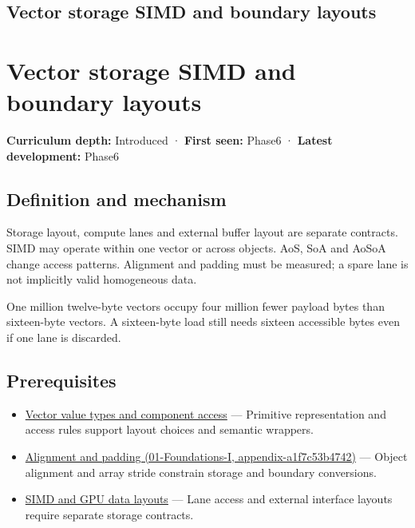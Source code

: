 \hypertarget{appendix-26bf6bf2fb8b}{}
\section*{Vector storage SIMD and boundary layouts}
\chapter{Vector storage SIMD and boundary layouts}\label{appendix-26bf6bf2fb8b-vector-storage-simd-and-boundary-layouts}

\textbf{Curriculum depth:} Introduced · \textbf{First seen:} Phase6 · \textbf{Latest development:} Phase6

\section{Definition and mechanism}\label{appendix-26bf6bf2fb8b-definition-and-mechanism}

Storage layout, compute lanes and external buffer layout are separate contracts. SIMD may operate within one vector or across objects. AoS, SoA and AoSoA change access patterns. Alignment and padding must be measured; a spare lane is not implicitly valid homogeneous data.

One million twelve-byte vectors occupy four million fewer payload bytes than sixteen-byte vectors. A sixteen-byte load still needs sixteen accessible bytes even if one lane is discarded.

\section{Prerequisites}\label{appendix-26bf6bf2fb8b-prerequisites}

\begin{itemize}
\tightlist
\item
  \hyperref[appendix-37a39984ba66]{Vector value types and component access} --- Primitive representation and access rules support layout choices and semantic wrappers.
\item
  \href{../01-Foundations-I/main.pdf\#nameddest=appendix-a1f7c53b4742}{Alignment and padding (01-Foundations-I, appendix-a1f7c53b4742)} --- Object alignment and array stride constrain storage and boundary conversions.
\item
  \hyperref[appendix-3c7b1a56de01]{SIMD and GPU data layouts} --- Lane access and external interface layouts require separate storage contracts.
\end{itemize}

